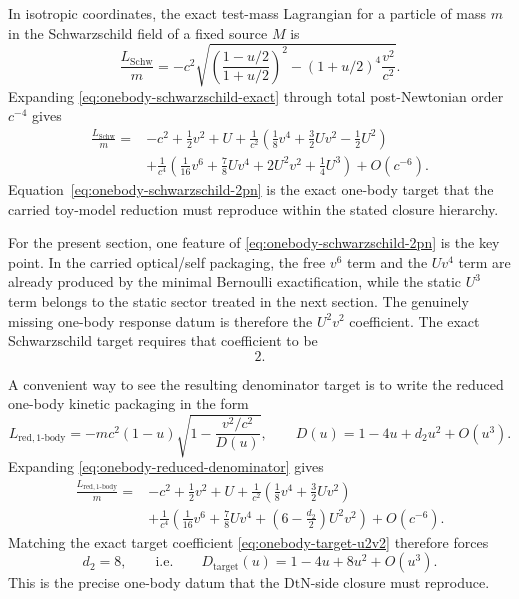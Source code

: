\documentclass[11pt]{article}
\newcommand{\DtN}{\mathrm{DtN}}
\newcommand{\Schw}{\mathrm{Schw}}
\begin{document}
In isotropic coordinates, the exact test-mass Lagrangian for a particle of mass \(m\)
in the Schwarzschild field of a fixed source \(M\) is
\begin{equation}
\frac{L_{\Schw}}{m}
=-c^2\sqrt{\left(\frac{1-u/2}{1+u/2}\right)^2-
(1+u/2)^4\frac{v^2}{c^2}}.
\label{eq:onebody-schwarzschild-exact}
\end{equation}
Expanding \cref{eq:onebody-schwarzschild-exact} through total post-Newtonian order
\(c^{-4}\) gives
\begin{align}
\frac{L_{\Schw}}{m}
={}&-c^2
+\frac12 v^2+U
+\frac{1}{c^2}\left(\frac18 v^4+\frac32 Uv^2-\frac12 U^2\right)
\nonumber\\
&
+\frac{1}{c^4}\left(\frac1{16}v^6+\frac78 Uv^4+2U^2v^2+\frac14 U^3\right)
+O(c^{-6}).
\label{eq:onebody-schwarzschild-2pn}
\end{align}
Equation~\eqref{eq:onebody-schwarzschild-2pn} is the exact one-body target that the
carried toy-model reduction must reproduce within the stated closure hierarchy.

For the present section, one feature of \cref{eq:onebody-schwarzschild-2pn} is the key
point.  In the carried optical/self packaging, the free \(v^6\) term and the \(Uv^4\)
term are already produced by the minimal Bernoulli exactification, while the static
\(U^3\) term belongs to the static sector treated in the next section.  The genuinely
missing one-body response datum is therefore the \(U^2v^2\) coefficient.  The exact
Schwarzschild target requires that coefficient to be
\begin{equation}
2.
\label{eq:onebody-target-u2v2}
\end{equation}

A convenient way to see the resulting denominator target is to write the reduced one-body
kinetic packaging in the form
\begin{equation}
L_{\mathrm{red},1\text{-}\mathrm{body}}
=-m c^2(1-u)
\sqrt{1-\frac{v^2/c^2}{D(u)}},
\qquad
D(u)=1-4u+d_2u^2+O(u^3).
\label{eq:onebody-reduced-denominator}
\end{equation}
Expanding \cref{eq:onebody-reduced-denominator} gives
\begin{align}
\frac{L_{\mathrm{red},1\text{-}\mathrm{body}}}{m}
={}&-c^2+\frac12 v^2+U
+\frac{1}{c^2}\left(\frac18 v^4+\frac32 Uv^2\right)
\nonumber\\
&
+\frac{1}{c^4}\left(\frac1{16}v^6+\frac78 Uv^4+
\left(6-\frac{d_2}{2}\right)U^2v^2\right)
+O(c^{-6}).
\label{eq:onebody-reduced-denominator-expansion}
\end{align}
Matching the exact target coefficient \cref{eq:onebody-target-u2v2} therefore forces
\begin{equation}
d_2=8,
\qquad\text{i.e.}\qquad
D_{\mathrm{target}}(u)=1-4u+8u^2+O(u^3).
\label{eq:onebody-denominator-target}
\end{equation}
This is the precise one-body datum that the \(\DtN\)-side closure must reproduce.
\end{document}
